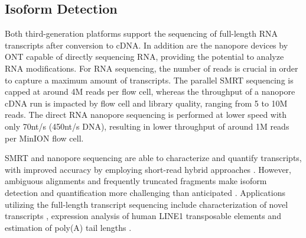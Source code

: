 



\subsection{Isoform Detection}
\label{subsec:state_of_art:isoform}

Both third-generation platforms support the sequencing of full-length RNA transcripts after conversion to cDNA. 
In addition are the nanopore devices by ONT capable of directly sequencing RNA, providing the potential to analyze RNA modifications.
For RNA sequencing, the number of reads is crucial in order to capture a maximum amount of transcripts.
The parallel SMRT sequencing is capped at around 4M reads per flow cell, whereas the throughput of a nanopore cDNA run is impacted by flow cell and library quality, ranging from 5 to 10M reads.
The direct RNA nanopore sequencing is performed at lower speed with only 70nt/s (450nt/s DNA), resulting in lower throughput of around 1M reads per MinION flow cell.

SMRT and nanopore sequencing are able to characterize and quantify transcripts, with improved accuracy by employing short-read hybrid approaches \cite{Weirather2017, Zhang2019a}.
However, ambiguous alignments and frequently truncated fragments make isoform detection and quantification more challenging than anticipated \cite{Soneson2019}.
Applications utilizing the full-length transcript sequencing include characterization of novel transcripts \cite{Tombacz2015}, expression analysis of human LINE1 transposable elements \cite{Deininger2017} and estimation of poly(A) tail lengths \cite{Workman2019}.


